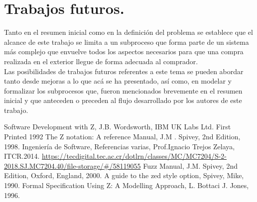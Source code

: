 \documentclass[12pt,a4paper,table]{article}
\begin{document}
%
%
%
%

\newpage
\section{Trabajos futuros.}
Tanto en el resumen inicial como en la definición del problema se establece que el alcance de este trabajo se limita a un subproceso que forma parte de un sistema más complejo que envuelve todos los aspectos necesarios para que una compra realizada en el exterior llegue de forma adecuada al comprador.\\[\baselineskip]
\indent Las posibilidades de trabajos futuros referentes a este tema se pueden abordar tanto desde mejoras a lo que acá se ha presentado, así como, en modelar y formalizar los subprocesos que, fueron mencionados brevemente en el resumen inicial y que anteceden o preceden al flujo desarrollado por los autores de este trabajo.


\newpage
\begin{thebibliography}{00}
 Software Development with Z, J.B. Wordsworth, IBM UK Labs Ltd. First Printed 1992
 The Z notation: A reference Manual, J.M . Spivey, 2nd Edition, 1998.
 Ingeniería de Software, Referencias varias, Prof.Ignacio Trejos Zelaya, ITCR.2014. \url{https://tecdigital.tec.ac.cr/dotlrn/classes/MC/MC7204/S-2-2018.SJ.MC7204.40/file-storage/#/58119055}
 Fuzz Manual, J.M. Spivey, 2nd Edition, Oxford, England, 2000.
 A guide to the zed style option, Spivey, Mike, 1990.
 Formal Specification Using Z: A Modelling Approach, L. Bottaci J. Jones, 1996.


\end{thebibliography}
\end{document}
